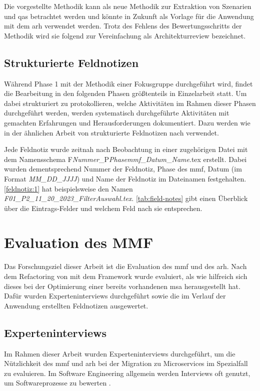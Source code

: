 Die vorgestellte Methodik kann als neue Methodik zur Extraktion von Szenarien und \glspl{qa} betrachtet werden und könnte in Zukunft als Vorlage für die Anwendung mit dem \gls{arh} verwendet werden.
Trotz des Fehlens des Bewertungsschritts der Methodik wird sie folgend zur Vereinfachung als Architekturreview bezeichnet.

\subsection{Strukturierte Feldnotizen}
\label{sec:structured-field-notes}
Während Phase 1 mit der Methodik einer Fokusgruppe durchgeführt wird, findet die Bearbeitung in den fol\-gen\-den Phasen größtenteils in Einzelarbeit statt.
Um dabei strukturiert zu protokollieren, welche Aktivitäten im Rahmen dieser Phasen durchgeführt werden, werden systematisch durch\-ge\-führte Aktivitäten mit gemachten Erfahrungen und Herausforderungen dokumentiert. %
Dazu werden wie in der ähnlichen Arbeit von  strukturierte Feldnotizen nach  verwendet.

Jede Feldnotiz wurde zeitnah nach Beobachtung in einer zugehörigen Datei mit dem Na\-mens\-sche\-ma F\emph{Nummer}\_P\emph{Phase\gls{mmf}}\_\emph{Datum}\_\emph{Name}.tex erstellt.
Dabei wurden dementsprechend Nummer der Feldnotiz, Phase des \gls{mmf}, Datum (im Format \emph{MM\_DD\_JJJJ}) und Name der Feldnotiz im Dateinamen festgehalten.
\cref{feldnotiz:1} hat beispielsweise den Namen \emph{F01\_P2\_11\_20\_2023\_FilterAuswahl.tex}.
\cref{tab:field-notes} gibt einen Überblick über die Eintrags-Felder und welchem Feld nach  sie entsprechen.



\section{Evaluation des MMF}

Das Forschungsziel dieser Arbeit ist die Evaluation des \gls{mmf} und des \gls{arh}.
Nach dem Refactoring von \jf mit dem Framework wurde evaluiert, als wie hilfreich sich dieses bei der Optimierung einer bereits vorhandenen \gls{msa} herausgestellt hat.
Dafür wurden Experteninterviews durchgeführt sowie die im Verlauf der Anwendung erstellten Feldnotizen ausgewertet.

\subsection{Experteninterviews}
\label{sec:methodik-interviews}
Im Rahmen dieser Arbeit wurden Experteninterviews durchgeführt, um die Nützlichkeit des \gls{mmf} und \gls{arh} bei der Migration zu Microservices im Spezialfall \jf zu evaluieren.
Im Software Engineering allgemein werden Interviews oft genutzt, um Softwareprozesse zu bewerten \cite{seaman2008qualitative}.

